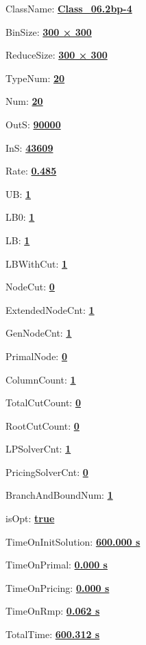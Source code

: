 \documentclass[11pt]{article}
\begin{document}
\pagestyle{empty}


ClassName: \underline{\textbf{Class_06.2bp-4}}
\par
BinSize: \underline{\textbf{300 × 300}}
\par
ReduceSize: \underline{\textbf{300 × 300}}
\par
TypeNum: \underline{\textbf{20}}
\par
Num: \underline{\textbf{20}}
\par
OutS: \underline{\textbf{90000}}
\par
InS: \underline{\textbf{43609}}
\par
Rate: \underline{\textbf{0.485}}
\par
UB: \underline{\textbf{1}}
\par
LB0: \underline{\textbf{1}}
\par
LB: \underline{\textbf{1}}
\par
LBWithCut: \underline{\textbf{1}}
\par
NodeCut: \underline{\textbf{0}}
\par
ExtendedNodeCnt: \underline{\textbf{1}}
\par
GenNodeCnt: \underline{\textbf{1}}
\par
PrimalNode: \underline{\textbf{0}}
\par
ColumnCount: \underline{\textbf{1}}
\par
TotalCutCount: \underline{\textbf{0}}
\par
RootCutCount: \underline{\textbf{0}}
\par
LPSolverCnt: \underline{\textbf{1}}
\par
PricingSolverCnt: \underline{\textbf{0}}
\par
BranchAndBoundNum: \underline{\textbf{1}}
\par
isOpt: \underline{\textbf{true}}
\par
TimeOnInitSolution: \underline{\textbf{600.000 s}}
\par
TimeOnPrimal: \underline{\textbf{0.000 s}}
\par
TimeOnPricing: \underline{\textbf{0.000 s}}
\par
TimeOnRmp: \underline{\textbf{0.062 s}}
\par
TotalTime: \underline{\textbf{600.312 s}}
\par
\newpage
\end{document}
